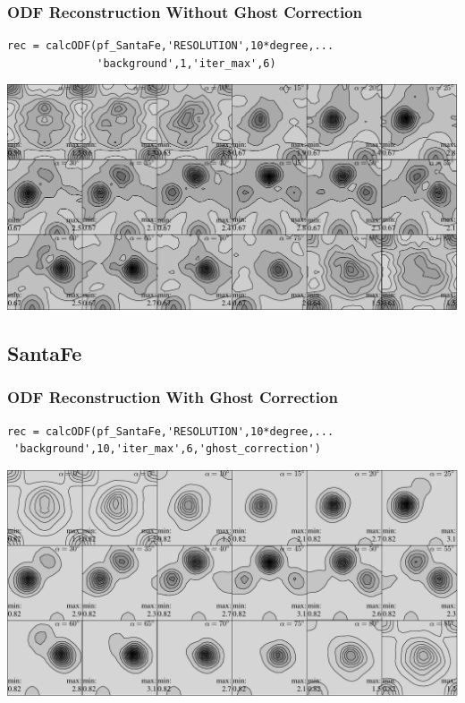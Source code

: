 \begin{frame}[fragile]
  \frametitle{ODF Reconstruction Without Ghost Correction}

\begin{lstlisting}
rec = calcODF(pf_SantaFe,'RESOLUTION',10*degree,...
              'background',1,'iter_max',6)
\end{lstlisting}

\includegraphics[width=\textwidth]{pic/rec_santafee}

\end{frame}
\subsection*{SantaFe}

\begin{frame}[fragile]
  \frametitle{ODF Reconstruction With Ghost Correction}

\begin{lstlisting}
rec = calcODF(pf_SantaFe,'RESOLUTION',10*degree,...
 'background',10,'iter_max',6,'ghost_correction')
\end{lstlisting}

\includegraphics[width=\textwidth]{pic/rec_santafee_ghost_correction}

\end{frame}


